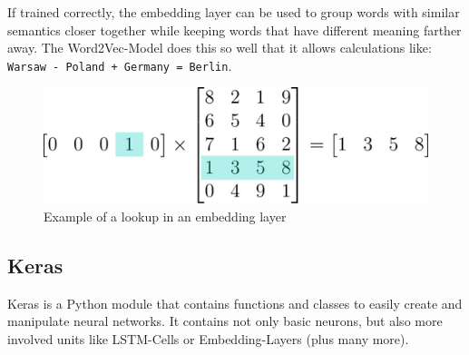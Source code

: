 	If trained correctly, the embedding layer can be used to group words with similar semantics closer
	together while keeping words that have different meaning farther away. The Word2Vec-Model \cite{w2v}
	does this so well that it allows calculations like: \verb|Warsaw - Poland + Germany = Berlin|.

    \begin{figure}
    \begin{center}
        \includegraphics[width=0.8 \linewidth]{lookup_matrix.png}
    \end{center}
    \caption{Example of a lookup in an embedding layer}
    \label{fig:embed}
    \end{figure}
    
	
  \subsection{Keras}
  \label{sub:keras}
  
    Keras is a Python module that contains functions and classes to easily create
    and manipulate neural networks. It contains not only basic neurons, but
    also more involved units like LSTM-Cells or Embedding-Layers (plus
     many more).
